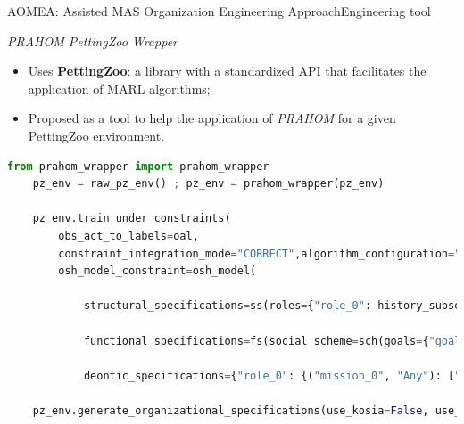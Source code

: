 \begin{frame}[fragile]{AOMEA: Assisted MAS Organization Engineering Approach}{Engineering tool}

    \begin{block}{\emph{PRAHOM PettingZoo Wrapper}\label{PettingZoo-wrapper}}
        \begin{itemize}
            \item Uses \textbf{PettingZoo}: a library with a standardized API that facilitates the application of MARL algorithms;
            \item Proposed as a tool to help the application of \emph{PRAHOM} for a given PettingZoo environment.
        \end{itemize}
    \end{block}

    \begin{lstlisting}[language=Python,basicstyle=\scriptsize]
    from prahom_wrapper import prahom_wrapper
    pz_env = raw_pz_env() ; pz_env = prahom_wrapper(pz_env)
    
    pz_env.train_under_constraints(
        obs_act_to_labels=oal,
        constraint_integration_mode="CORRECT",algorithm_configuration="default_MAPPO"
        osh_model_constraint=osh_model(
            
            structural_specifications=ss(roles={"role_0": history_subset(pattern="[o0,a1](1,4),[o1,a2](1,2)")},role_inheritance_relations=None, root_groups=None),
            
            functional_specifications=fs(social_scheme=sch(goals={"goal_0": history_subset(pattern="[#Any](0,*),[obs_goal_0]")},missions=["mission_0"], goals_structure=None,mission_to_goals={"mission_0": ["goal_0"]},mission_to_agent_cardinality=None),social_preferences=None),

            deontic_specifications={"role_0": {("mission_0", "Any"): ["agent_0", "agent_4"]}}))

    pz_env.generate_organizational_specifications(use_kosia=False, use_gosia=True,gosia_configuration={"generate_figures": True})
    \end{lstlisting}

\end{frame}
